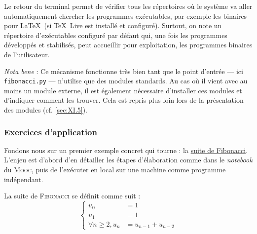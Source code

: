 Le retour du terminal permet de vérifier tous les répertoires où le système va aller automatiquement chercher les programmes exécutables, par exemple les binaires pour \LaTeX\ (si \TeX\ Live est installé et configuré). Surtout, on note un répertoire d'exécutables configuré par défaut  qui, une fois les programmes développés et stabilisés, peut accueillir pour exploitation, les programmes binaires de l'utilisateur.

\textit{Nota bene} : Ce mécanisme fonctionne très bien tant que le point d'entrée --- ici \texttt{fibonacci.py} --- n'utilise que des modules standards. Au cas où il vient avec au moins un module externe, il est également nécessaire d'installer ces modules et d'indiquer comment les trouver. Cela est repris plus loin lors de la présentation des modules (cf. \cref{sec:XI.5}).


\subsubsection[Exercices d'application]{Exercices d'application}
\label{subsub:X.1.4.2}


Fondons nous sur un premier exemple concret qui tourne : la \href{https://fr.wikipedia.org/wiki/Suite_de_Fibonacci}{suite de Fibonacci}. L'enjeu est d'abord d'en détailler les étapes d'élaboration comme dans le \textit{notebook} du \textsc{Mooc}, puis de l'exécuter en local sur une machine comme programme indépendant.

La suite de \textsc{Fibonacci} se définit comme suit :
\begin{equation}
\left\{
\begin{aligned}
u_{0} & = 1 \\[-1.5pt]
u_{1} & = 1 \\[-1.5pt]
\forall n \geq 2, u_{n} & = u_{n-1} + u_{n-2}
\end{aligned} \right.
\end{equation}

